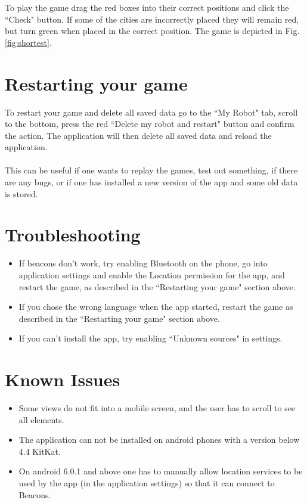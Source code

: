 To play the game drag the red boxes into their correct positions and click the ``Check" button. If some of the cities are incorrectly placed they will remain red, but turn green when placed in the correct position. The game is depicted in Fig. \ref{fig:shortest}.


\section{Restarting your game}
To restart your game and delete all saved data go to the ``My Robot" tab, scroll to the bottom, press the red ``Delete my robot and restart" button and confirm the action. The application will then delete all saved data and reload the application.\\\\
This can be useful if one wants to replay the games, test out something, if there are any bugs, or if one has installed a new version of the app and some old data is stored.

\section{Troubleshooting}
\begin{itemize}
    \item If beacons don't work, try enabling Bluetooth on the phone, go into application settings and enable the Location permission for the app, and restart the game, as described in the ``Restarting your game" section above.
    \item If you chose the wrong language when the app started, restart the game as described in the ``Restarting your game" section above.
    \item If you can't install the app, try enabling ``Unknown sources" in settings.
\end{itemize}


\section{Known Issues}
\begin{itemize}
    \item Some views do not fit into a mobile screen, and the user has to scroll to see all elements.
    \item The application can not be installed on android phones with a version below 4.4 KitKat.
    \item On android 6.0.1 and above one has to manually allow location services to be used by the app (in the application settings) so that it can connect to Beacons.
\end{itemize}
